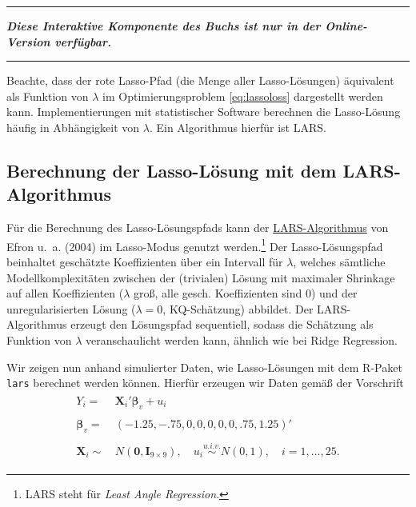 \documentclass[
  a4paper,
  DIV=11,
  oneside]{scrreprt}
\begin{document}
\begin{center}\rule{0.5\linewidth}{0.5pt}\end{center}

\textbf{\emph{Diese Interaktive Komponente des Buchs ist nur in der
Online-Version verfügbar.}}

\begin{center}\rule{0.5\linewidth}{0.5pt}\end{center}

Beachte, dass der rote Lasso-Pfad (die Menge aller Lasso-Lösungen)
äquivalent als Funktion von \(\lambda\) im Optimierungsproblem
\eqref{eq:lassoloss} dargestellt werden kann. Implementierungen mit
statistischer Software berechnen die Lasso-Lösung häufig in Abhängigkeit
von \(\lambda\). Ein Algorithmus hierfür ist LARS.

\hypertarget{berechnung-der-lasso-luxf6sung-mit-dem-lars-algorithmus}{%
\subsection{Berechnung der Lasso-Lösung mit dem
LARS-Algorithmus}\label{berechnung-der-lasso-luxf6sung-mit-dem-lars-algorithmus}}

Für die Berechnung des Lasso-Lösungspfads kann der
\href{https://en.wikipedia.org/wiki/Least-angle_regression}{LARS-Algorithmus}
von Efron u.~a. (2004) im Lasso-Modus genutzt werden.\footnote{LARS
  steht für \emph{Least Angle Regression}.} Der Lasso-Lösungspfad
beinhaltet geschätzte Koeffizienten über ein Intervall für \(\lambda\),
welches sämtliche Modellkomplexitäten zwischen der (trivialen) Lösung
mit maximaler Shrinkage auf allen Koeffizienten (\(\lambda\) groß, alle
gesch. Koeffizienten sind \(0\)) und der unregularisierten Lösung
(\(\lambda = 0\), KQ-Schätzung) abbildet. Der LARS-Algorithmus erzeugt
den Lösungspfad sequentiell, sodass die Schätzung als Funktion von
\(\lambda\) veranschaulicht werden kann, ähnlich wie bei Ridge
Regression.

Wir zeigen nun anhand simulierter Daten, wie Lasso-Lösungen mit dem
R-Paket \texttt{lars} berechnet werden können. Hierfür erzeugen wir
Daten gemäß der Vorschrift \begin{align}
  \begin{split}
  Y_i =&\, \boldsymbol{X}_i' \boldsymbol{\beta}_v + u_i\\
  \\
  \boldsymbol{\beta}_v =&\, (-1.25, -.75, 0, 0, 0, 0, 0, .75, 1.25)'\\
  \\
  \boldsymbol{X}_i \sim&\, N(\boldsymbol{0}, \boldsymbol{I}_{9\times9}), \quad u_i \overset{u.i.v.}{\sim} N(0, 1), \quad i = 1,\dots,25.
  \end{split}\label{eq:larsdgp}
\end{align}
\end{document}
